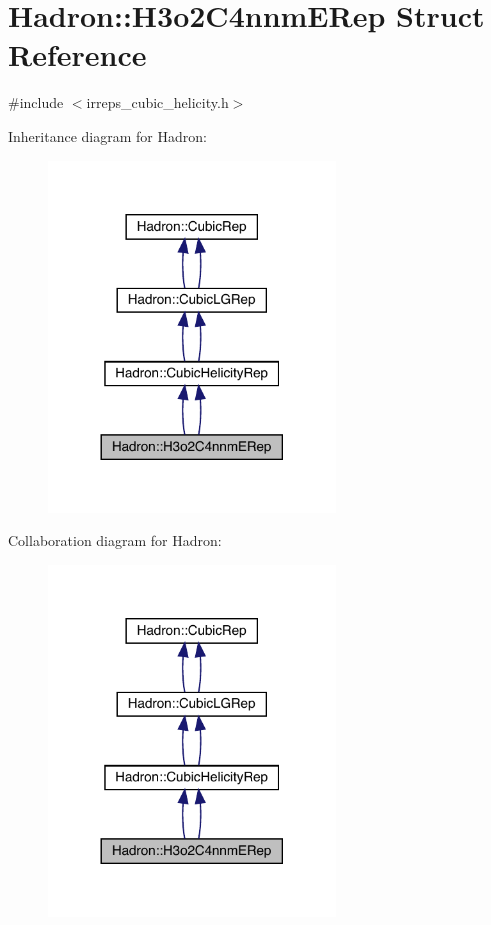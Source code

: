 \hypertarget{structHadron_1_1H3o2C4nnmERep}{}\section{Hadron\+:\+:H3o2\+C4nnm\+E\+Rep Struct Reference}
\label{structHadron_1_1H3o2C4nnmERep}


{\ttfamily \#include $<$irreps\+\_\+cubic\+\_\+helicity.\+h$>$}



Inheritance diagram for Hadron\+:\nopagebreak
\begin{figure}[H]
\begin{center}
\leavevmode
\includegraphics[width=216pt]{d6/dcb/structHadron_1_1H3o2C4nnmERep__inherit__graph}
\end{center}
\end{figure}


Collaboration diagram for Hadron\+:\nopagebreak
\begin{figure}[H]
\begin{center}
\leavevmode
\includegraphics[width=216pt]{db/d26/structHadron_1_1H3o2C4nnmERep__coll__graph}
\end{center}
\end{figure}

